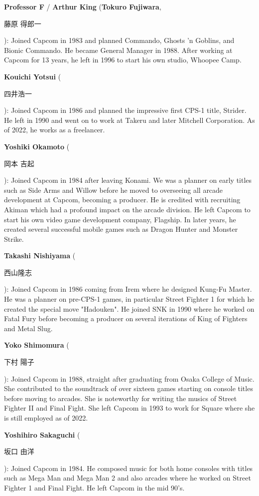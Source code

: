 \textbf{Professor F} / \textbf{Arthur King} (\textbf{Tokuro Fujiwara}, \begin{CJK}{UTF8}{min}藤原 得郎一\end{CJK}): Joined Capcom in 1983 and planned Commando, Ghosts 'n Goblins, and Bionic Commando. He became General Manager in 1988. After working at Capcom for 13 years, he left in 1996 to start his own studio, Whoopee Camp.

\textbf{Kouichi Yotsui} (\begin{CJK}{UTF8}{min}四井浩一\end{CJK}): Joined Capcom in 1986 and planned the impressive first CPS-1 title, Strider. He left in 1990 and went on to work at Takeru and later Mitchell Corporation. As of 2022, he works as a freelancer.

\textbf{Yoshiki Okamoto} (\begin{CJK}{UTF8}{min}岡本 吉起\end{CJK}): Joined Capcom in 1984 after leaving Konami. We was a planner on early titles such as Side Arms and Willow before he moved to overseeing all arcade development at Capcom, becoming a producer. He is credited with recruiting Akiman which had a profound impact on the arcade division. He left Capcom to start his own video game development company, Flagship. In later years, he created several successful mobile games such as Dragon Hunter and Monster Strike.   

\textbf{Takashi Nishiyama} (\begin{CJK}{UTF8}{min}西山隆志\end{CJK}): Joined Capcom in 1986 coming from Irem where he designed Kung-Fu Master. He was a planner on pre-CPS-1 games, in particular Street Fighter 1 for which he created the special move "Hadouken". He joined SNK in 1990 where he worked on Fatal Fury before becoming a producer on several iterations of King of Fighters and Metal Slug.


\textbf{Yoko Shimomura} (\begin{CJK}{UTF8}{min}下村 陽子\end{CJK}): Joined Capcom in 1988, straight after graduating from Osaka College of Music. She contributed to the soundtrack of over sixteen games starting on console titles before moving to arcades. She is noteworthy for writing the musics of Street Fighter II and Final Fight. She left Capcom in 1993 to work for Square where she is still employed as of 2022.

\textbf{Yoshihiro Sakaguchi} (\begin{CJK}{UTF8}{min}坂口 由洋\end{CJK}): Joined Capcom in 1984. He composed music for both home consoles with titles such as Mega Man and Mega Man 2 and also arcades where he worked on Street Fighter 1 and Final Fight. He left Capcom in the mid 90's.